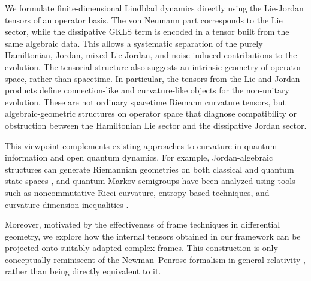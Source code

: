 \documentclass[notitlepage,aip,reprint,onecolumn]{revtex4-1}
\theoremstyle{definition}
\begin{document}
We formulate finite-dimensional Lindblad dynamics directly using the Lie-Jordan tensors of an operator basis. The von Neumann part corresponds to the Lie sector, while the dissipative GKLS term is encoded in a tensor built from the same algebraic data. This allows a systematic separation of the purely Hamiltonian, Jordan, mixed Lie-Jordan, and noise-induced contributions to the evolution. The tensorial structure also suggests an intrinsic geometry of operator space, rather than spacetime. In particular, the tensors from the Lie and Jordan products define connection-like and curvature-like objects for the non-unitary evolution. These are not ordinary spacetime Riemann curvature tensors, but algebraic-geometric structures on operator space that diagnose compatibility or obstruction between the Hamiltonian Lie sector and the dissipative Jordan sector.

This viewpoint complements existing approaches to curvature in quantum information and open quantum dynamics. For example, Jordan-algebraic structures can generate Riemannian geometries on both classical and quantum state spaces \cite{Ciaglia:2017dvs}, and quantum Markov semigroups have been analyzed using tools such as noncommutative Ricci curvature, entropy-based techniques, and curvature-dimension inequalities \cite{Carlen:2017hgj}.

Moreover, motivated by the effectiveness of frame techniques in differential geometry, we explore how the internal tensors obtained in our framework can be projected onto suitably adapted complex frames. This construction is only conceptually reminiscent of the Newman–Penrose formalism in general relativity \cite{Newman:1961qr,Bixano:2026ouq,Bixano:2026xum}, rather than being directly equivalent to it.
\end{document}
